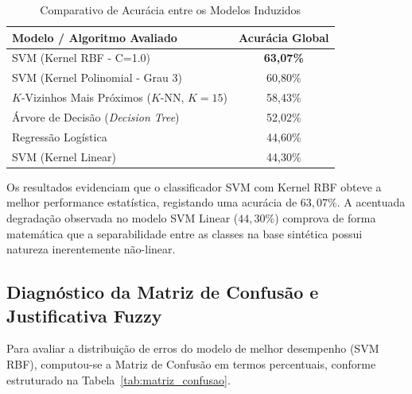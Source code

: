 \documentclass[journal]{IEEEtran}
\begin{document}
\begin{table}[!t]
\renewcommand{\arraystretch}{1.3}
\caption{Comparativo de Acurácia entre os Modelos Induzidos}
\label{tab:resultados_modelos}
\centering
\begin{tabular}{l|c}
\hline
\bfseries Modelo / Algoritmo Avaliado & \bfseries Acurácia Global \\
\hline\hline
SVM (Kernel RBF - C=1.0) & \textbf{63,07\%} \\
SVM (Kernel Polinomial - Grau 3) & 60,80\% \\
$K$-Vizinhos Mais Próximos ($K$-NN, $K=15$) & 58,43\% \\
Árvore de Decisão (\textit{Decision Tree}) & 52,02\% \\
Regressão Logística & 44,60\% \\
SVM (Kernel Linear) & 44,30\% \\
\hline
\end{tabular}
\end{table}

Os resultados evidenciam que o classificador SVM com Kernel RBF obteve a melhor performance estatística, registando uma acurácia de $63,07\%$. A acentuada degradação observada no modelo SVM Linear ($44,30\%$) comprova de forma matemática que a separabilidade entre as classes na base sintética possui natureza inerentemente não-linear.

\subsection{Diagnóstico da Matriz de Confusão e Justificativa Fuzzy}
Para avaliar a distribuição de erros do modelo de melhor desempenho (SVM RBF), computou-se a Matriz de Confusão em termos percentuais, conforme estruturado na Tabela~\ref{tab:matriz_confusao}.

\begin{table}[!t]
\renewcommand{\arraystretch}{1.3}
\setlength{\tabcolsep}{3pt}
\caption{Matriz de Confusão Percentual (Modelo de Referência SVM RBF)}
\label{tab:matriz_confusao}
\centering
{}
\end{table}
\end{document}
